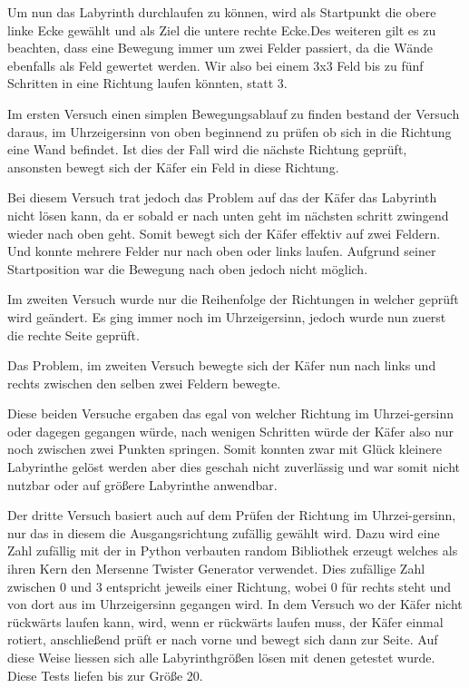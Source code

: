 \documentclass[12pt, a4paper, titlepage]{article}
\begin{document}
\bigskip

Um nun das Labyrinth durchlaufen zu können, wird als Startpunkt die obere linke Ecke gewählt und als Ziel die untere rechte Ecke.Des weiteren gilt es zu beachten, dass eine Bewegung immer um zwei Felder passiert, da die Wände ebenfalls als Feld gewertet werden.
Wir also bei einem 3x3 Feld bis zu fünf Schritten in eine Richtung laufen könnten, statt 3.

\bigskip

Im ersten Versuch einen simplen Bewegungsablauf zu finden bestand der Versuch daraus, im Uhrzeigersinn von oben beginnend zu prüfen ob sich in die Richtung eine Wand befindet.
Ist dies der Fall wird die nächste Richtung geprüft, ansonsten bewegt sich der Käfer ein Feld in diese Richtung.


Bei diesem Versuch trat jedoch das Problem auf das der Käfer das Labyrinth nicht lösen kann, da er sobald er nach unten geht im nächsten schritt zwingend wieder nach oben geht.
Somit bewegt sich der Käfer effektiv auf zwei Feldern.
Und konnte mehrere Felder nur nach oben oder links laufen.
Aufgrund seiner Startposition war die Bewegung nach oben jedoch nicht möglich.

\bigskip

Im zweiten Versuch wurde nur die Reihenfolge der Richtungen in welcher geprüft wird geändert.
Es ging immer noch im Uhrzeigersinn, jedoch wurde nun zuerst die rechte Seite geprüft.

Das Problem, im zweiten Versuch bewegte sich der Käfer nun nach links und rechts zwischen den selben zwei Feldern bewegte.


\bigskip

Diese beiden Versuche ergaben das egal von welcher Richtung im Uhrzei-gersinn oder dagegen gegangen würde, nach wenigen Schritten würde der Käfer also nur noch zwischen zwei Punkten springen.
Somit konnten zwar mit Glück kleinere Labyrinthe gelöst werden aber dies geschah nicht zuverlässig und war somit nicht nutzbar oder auf größere Labyrinthe anwendbar.

\bigskip

Der dritte Versuch basiert auch auf dem Prüfen der Richtung im Uhrzei-gersinn, nur das in diesem die Ausgangsrichtung zufällig gewählt wird.
Dazu wird eine Zahl zufällig mit der in Python verbauten random Bibliothek erzeugt welches als ihren Kern den Mersenne Twister Generator verwendet.
Dies zufällige Zahl zwischen 0 und 3 entspricht jeweils einer Richtung, wobei 0 für rechts steht und von dort aus im Uhrzeigersinn gegangen wird.
In dem Versuch wo der Käfer nicht rückwärts laufen kann, wird, wenn er rückwärts laufen muss, der Käfer einmal rotiert, anschließend prüft er nach vorne und bewegt sich dann zur Seite.
Auf diese Weise liessen sich alle Labyrinthgrößen lösen mit denen getestet wurde.
Diese Tests liefen bis zur Größe 20.
\end{document}
